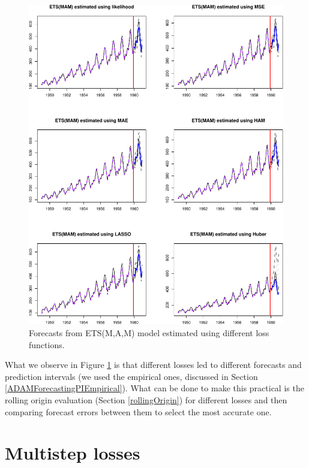 \documentclass[]{book}
\theoremstyle{definition}
\theoremstyle{definition}
\theoremstyle{definition}
\theoremstyle{definition}
\theoremstyle{remark}
\begin{document}
\begin{figure}
\centering
\includegraphics{Svetunkov--2022----ADAM_files/figure-latex/adamModelsForecasts-1.pdf}
\caption{\label{fig:adamModelsForecasts}Forecasts from ETS(M,A,M) model estimated using different loss functions.}
\end{figure}

What we observe in Figure \ref{fig:adamModelsForecasts} is that different losses led to different forecasts and prediction intervals (we used the empirical ones, discussed in Section \ref{ADAMForecastingPIEmpirical}). What can be done to make this practical is the rolling origin evaluation (Section \ref{rollingOrigin}) for different losses and then comparing forecast errors between them to select the most accurate one.

\hypertarget{multistepLosses}{%
\section{Multistep losses}\label{multistepLosses}}
\end{document}
